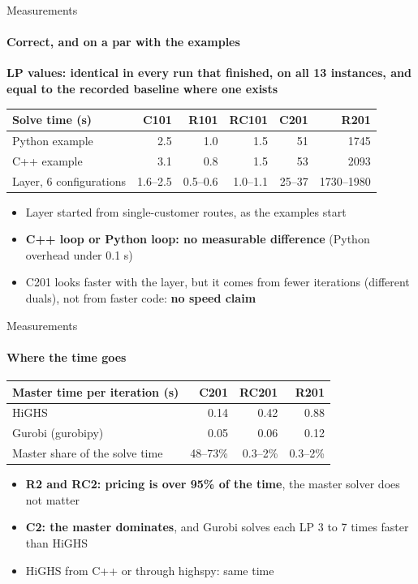 \documentclass[aspectratio=169]{beamer}
\begin{document}
\begin{frame}{Measurements}
  \framesubtitle{Correct, and on a par with the examples}

  \small
  \textbf{LP values: identical in every run that finished, on all 13 instances, and equal to the recorded
  baseline where one exists}

  \vspace{0.6em}
  \centering
  \begin{tabular}{lrrrrr}
    \toprule
    \textbf{Solve time (s)} & \textbf{C101} & \textbf{R101} & \textbf{RC101} & \textbf{C201} & \textbf{R201} \\
    \midrule
    Python example & 2.5 & 1.0 & 1.5 & 51 & 1745 \\
    C++ example & 3.1 & 0.8 & 1.5 & 53 & 2093 \\
    Layer, 6 configurations & 1.6--2.5 & 0.5--0.6 & 1.0--1.1 & 25--37 & 1730--1980 \\
    \bottomrule
  \end{tabular}

  \vspace{0.8em}
  \begin{itemize}
    \item Layer started from single-customer routes, as the examples start
    \item \textbf{C++ loop or Python loop: no measurable difference} (Python overhead under 0.1 s)
    \item C201 looks faster with the layer, but it comes from fewer iterations
      (different duals), not from faster code: \textbf{no speed claim}
  \end{itemize}
\end{frame}

\begin{frame}{Measurements}
  \framesubtitle{Where the time goes}

  \small
  \centering
  \begin{tabular}{lrrr}
    \toprule
    \textbf{Master time per iteration (s)} & \textbf{C201} & \textbf{RC201} & \textbf{R201} \\
    \midrule
    HiGHS & 0.14 & 0.42 & 0.88 \\
    Gurobi (gurobipy) & 0.05 & 0.06 & 0.12 \\
    \midrule
    Master share of the solve time & 48--73\% & 0.3--2\% & 0.3--2\% \\
    \bottomrule
  \end{tabular}

  \vspace{0.8em}
  \begin{itemize}
    \item \textbf{R2 and RC2: pricing is over 95\% of the time}, the master solver does not matter
    \item \textbf{C2: the master dominates}, and Gurobi solves each LP 3 to 7 times faster than HiGHS
    \item HiGHS from C++ or through highspy: same time
  \end{itemize}
\end{frame}
\end{document}
